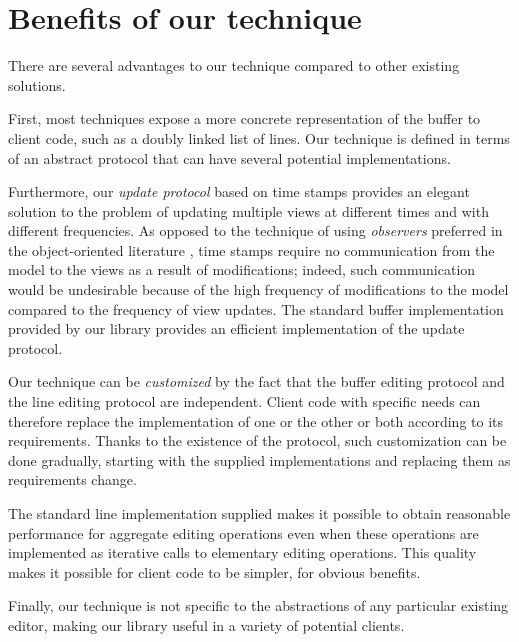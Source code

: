 \section{Benefits of our technique}
 
There are several advantages to our technique compared to other
existing solutions.

First, most techniques expose a more concrete representation of the
buffer to client code, such as a doubly linked list of lines.  Our
technique is defined in terms of an abstract \clos{} protocol that can
have several potential implementations.

Furthermore, our \emph{update protocol} based on time stamps provides
an elegant solution to the problem of updating multiple views at
different times and with different frequencies.  As opposed to the
technique of using \emph{observers} preferred in the object-oriented
literature \cite{Gamma:1998:DPC:551551}, time stamps require no
communication from the model to the views as a result of
modifications; indeed, such communication would be undesirable because
of the high frequency of modifications to the model compared to the
frequency of view updates.  The standard buffer implementation
provided by our library provides an efficient implementation of the
update protocol.

Our technique can be \emph{customized} by the fact that the buffer
editing protocol and the line editing protocol are independent.
Client code with specific needs can therefore replace the
implementation of one or the other or both according to its
requirements.  Thanks to the existence of the \clos{} protocol, such
customization can be done gradually, starting with the supplied
implementations and replacing them as requirements change.

The standard line implementation supplied makes it possible to obtain
reasonable performance for aggregate editing operations even when
these operations are implemented as iterative calls to elementary
editing operations.  This quality makes it possible for client code to
be simpler, for obvious benefits.

Finally, our technique is not specific to the abstractions of any
particular existing editor, making our library useful in a variety of
potential clients.
